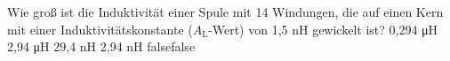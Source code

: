     {Wie groß ist die Induktivität einer Spule mit 14 Windungen, die auf einen Kern mit einer Induktivitätskonstante ($A_{\textrm{L}}$-Wert) von 1,5 nH gewickelt ist?}
    {0,294 \si{\micro\henry}}
    {2,94 \si{\micro\henry}}
    {29,4 nH}
    {2,94 nH}
    {false}{false}